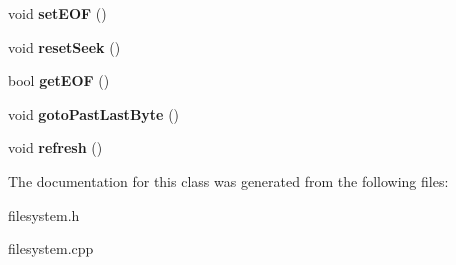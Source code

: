 \begin{DoxyCompactItemize}
void {\bfseries set\+E\+OF} ()
\item 
\mbox{\label{classFileOpen_aebc4cc325efd14978893ccc81b6eea51}} 
void {\bfseries reset\+Seek} ()
\item 
\mbox{\label{classFileOpen_af14a37e4bb198d00105fb6eaac065098}} 
bool {\bfseries get\+E\+OF} ()
\item 
\mbox{\label{classFileOpen_a8f05a036d43fd6e957956771c1384c11}} 
void {\bfseries goto\+Past\+Last\+Byte} ()
\item 
\mbox{\label{classFileOpen_ac10189670f476050bc3fdb44d74dcb33}} 
void {\bfseries refresh} ()
\end{DoxyCompactItemize}


The documentation for this class was generated from the following files\+:\begin{DoxyCompactItemize}
\item 
filesystem.\+h\item 
filesystem.\+cpp\end{DoxyCompactItemize}

